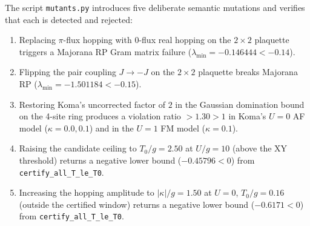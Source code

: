 \documentclass[11pt]{article}
\theoremstyle{definition}
\theoremstyle{remark}
\begin{document}
The script \texttt{mutants.py} introduces five deliberate semantic mutations and verifies that each is detected and rejected:
\begin{enumerate}[leftmargin=2em]
\item Replacing $\pi$-flux hopping with $0$-flux real hopping on the $2 \times 2$ plaquette triggers a Majorana RP Gram matrix failure ($\lambda_{\min} = -0.146444 < -0.14$).
\item Flipping the pair coupling $J \to -J$ on the $2 \times 2$ plaquette breaks Majorana RP ($\lambda_{\min} = -1.501184 < -0.15$).
\item Restoring Koma's uncorrected factor of $2$ in the Gaussian domination bound on the 4-site ring produces a violation ratio $> 1.30 > 1$ in Koma's $U = 0$ AF model ($\kappa = 0.0, 0.1$) and in the $U = 1$ FM model ($\kappa = 0.1$).
\item Raising the candidate ceiling to $T_0/g = 2.50$ at $U/g = 10$ (above the XY threshold) returns a negative lower bound ($-0.45796 < 0$) from \texttt{certify\_all\_T\_le\_T0}.
\item Increasing the hopping amplitude to $|\kappa|/g = 1.50$ at $U = 0$, $T_0/g = 0.16$ (outside the certified window) returns a negative lower bound ($-0.6171 < 0$) from \texttt{certify\_all\_T\_le\_T0}.
\end{enumerate}


\end{document}
